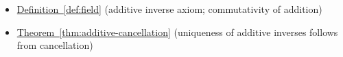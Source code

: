 \begin{dependencies}
\begin{itemize}
  \item \hyperref[def:field]{Definition~\ref*{def:field}}
        \textnormal{(additive inverse axiom; commutativity of addition)}
  \item \hyperref[thm:additive-cancellation]{Theorem~\ref*{thm:additive-cancellation}}
        \textnormal{(uniqueness of additive inverses follows from cancellation)}
\end{itemize}
\end{dependencies}
